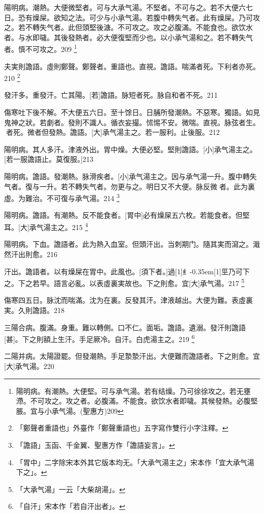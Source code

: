 \documentclass[11pt,oneside,b5paper]{ctexbook}
\begin{document}
\begin{flushleft}
陽明病。潮熱。大便微堅者。可与大承气湯。不堅者。不可与之。若不大便六七日。恐有燥屎。欲知之法。可少与小承气湯。若腹中轉失气者。此有燥屎。乃可攻之。若不轉失气者。此但頭堅後溏。不可攻之。攻之必腹滿。不能食也。欲饮水者。与水即噦。其後發熱者。必大便復堅而少也。以小承气湯和之。若不轉失气者。慎不可攻之。209
\footnote{陽明病。有潮熱。大便堅。可与承气湯。若有结燥。乃可徐徐攻之。若无壅滯。不可攻之。攻之者。必腹滿。不能食。欲饮水者即噦。其候發熱。必腹堅脹。宜与小承气湯。(聖惠方)209}

夫実則譫語。虛則鄭聲。鄭聲者。重語也。直視。譫語。喘滿者死。下利者亦死。210
\footnote{「鄭聲者重語也」外臺作「鄭聲重語也」五字寫作雙行小字注釋。}

發汗多。重發汗。亡其陽。[若]譫語。脉短者死。脉自和者不死。211

傷寒吐下後不解。不大便五六日。至十馀日。日脯所發潮熱。不惡寒。獨語。如見鬼神之狀。若劇者。發則不識人。循衣妄撮。怵惕不安。微喘。直視。脉弦者生。{𬈧}者死。微者但發熱。譫語。[大]承气湯主之。若一服利。止後服。212

陽明病。其人多汗。津液外出。胃中燥。大便必堅。堅則譫語。[小]承气湯主之。[若一服譫語止。莫復服。]213

陽明病。譫語。發潮熱。脉滑疾者。[小]承气湯主之。因与承气湯一升。腹中轉失气者。復与一升。若不轉失气者。勿更与之。明日又不大便。脉反微{𬈧}者。此为裏虛。为難治。不可復与承气湯。214
\footnote{「譫語」玉函、千金翼、聖惠方作「譫語妄言」。}

陽明病。譫語。有潮熱。反不能食者。[胃中]必有燥屎五六枚。若能食者。但堅耳。[大]承气湯主之。215
\footnote{「胃中」二字除宋本外其它版本均无。「大承气湯主之」宋本作「宜大承气湯下之」。}

陽明病。下血。譫語者。此为熱入血室。但頭汗出。当刺期门。隨其実而瀉之。濈然汗出則愈。216

汗出。譫語者。以有燥屎在胃中。此風也。[須下者。]過{\hbox{\scalebox{0.68}[1]{纟}\kern-0.35em\scalebox{0.64}[1]{巠}}}乃可下之。下之若早。語言必亂。以表虛裏実故也。下之則愈。宜[大]承气湯。217
\footnote{「大承气湯」一云「大柴胡湯」。}

傷寒四五日。脉沈而喘滿。沈为在裏。反發其汗。津液越出。大便为難。表虛裏実。久則譫語。218

三陽合病。腹滿。身重。難以轉側。口不仁。面垢。譫語。遺溺。發汗則譫語[甚]。下之則額上生汗。手足厥冷。自汗。白虎湯主之。219
\footnote{「自汗」宋本作「若自汗出者」。}

二陽并病。太陽證罷。但發潮熱。手足漐漐汗出。大便難而譫語者。下之則愈。宜[大]承气湯。220


\end{flushleft}
\end{document}
